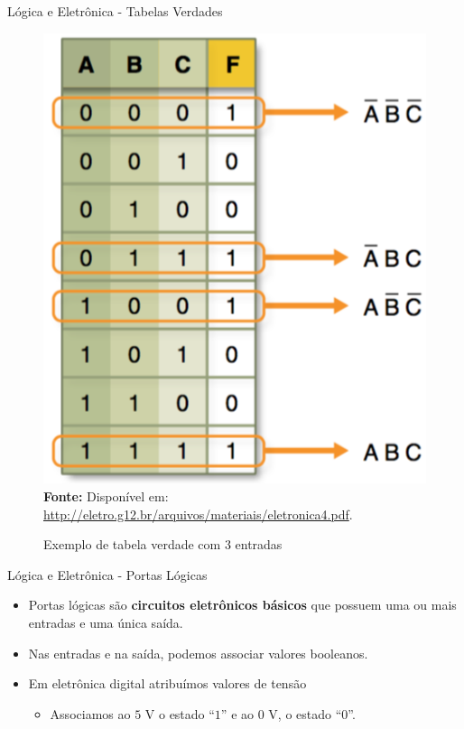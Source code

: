 \documentclass[aspectratio=169]{beamer}
\begin{document}
	\begin{frame}{Lógica e Eletrônica - Tabelas Verdades}
			\begin{figure}[h]
				\centering
				\caption{Exemplo de tabela verdade com 3 entradas }
				\includegraphics[height=0.7\textheight]{img/ed/ed-tabela_circuito2.png}
				\\
				{\footnotesize \textbf{Fonte:} Disponível em: \url{http://eletro.g12.br/arquivos/materiais/eletronica4.pdf}.}
				\label{fig:ed-tabela_circuito2}
			\end{figure}
	\end{frame}

	\begin{frame}{Lógica e Eletrônica - Portas Lógicas}
		\begin{itemize}
			\setlength\itemsep{1.5em}
			\item Portas lógicas são \textbf{circuitos eletrônicos básicos} que possuem uma ou mais entradas e uma única saída.
			
			\item Nas entradas e na saída, podemos associar valores booleanos. 
			
				\bigskip
			
			\item Em eletrônica digital atribuímos valores de tensão 
			\begin{itemize}
				\item Associamos ao $ 5 $ V o estado ``$ 1 $'' e ao $ 0 $ V, o estado ``$ 0 $''.
			\end{itemize}
		\end{itemize}
	\end{frame}
	
\end{document}
